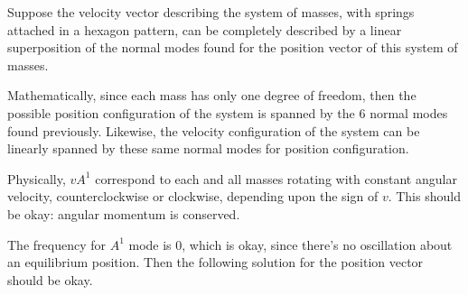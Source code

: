 \documentclass[twoside,10pt]{amsart}
\begin{document}
\begin{enumerate}
Suppose the velocity vector describing the system of masses, with springs attached in a hexagon pattern, can be completely described by a linear superposition of the normal modes found for the position vector of this system of masses.  

Mathematically, since each mass has only one degree of freedom, then the possible position configuration of the system is spanned by the 6 normal modes found previously.  Likewise, the velocity configuration of the system can be linearly spanned by these same normal modes for position configuration.  

Physically, $vA^1$ correspond to each and all masses rotating with constant angular velocity, counterclockwise or clockwise, depending upon the sign of $v$.  This should be okay: angular momentum is conserved.  

The frequency for $A^1$ mode is $0$, which is okay, since there's no oscillation about an equilibrium position.  Then the following solution for the position vector should be okay.  


\end{enumerate}
\end{document}

